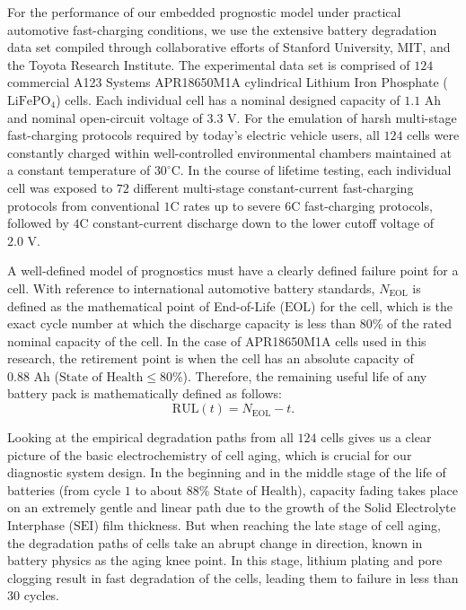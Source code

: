 \documentclass[pdflatex,sn-mathphys-num]{sn-jnl}%
\theoremstyle{thmstyleone}%
\theoremstyle{thmstyletwo}%
\theoremstyle{thmstylethree}%
\begin{document}
For the performance of our embedded prognostic model under practical automotive fast-charging conditions, we use the extensive battery degradation data set compiled through collaborative efforts of Stanford University, MIT, and the Toyota Research Institute. The experimental data set is comprised of $124$ commercial A123 Systems APR18650M1A cylindrical Lithium Iron Phosphate ($\text{LiFePO}_4$) cells. Each individual cell has a nominal designed capacity of $1.1\text{ Ah}$ and nominal open-circuit voltage of $3.3\text{ V}$. For the emulation of harsh multi-stage fast-charging protocols required by today's electric vehicle users, all $124$ cells were constantly charged within well-controlled environmental chambers maintained at a constant temperature of $30^\circ\text{C}$. In the course of lifetime testing, each individual cell was exposed to $72$ different multi-stage constant-current fast-charging protocols from conventional $1\text{C}$ rates up to severe $6\text{C}$ fast-charging protocols, followed by $4\text{C}$ constant-current discharge down to the lower cutoff voltage of $2.0\text{ V}$.

A well-defined model of prognostics must have a clearly defined failure point for a cell. With reference to international automotive battery standards, $N_{\text{EOL}}$ is defined as the mathematical point of End-of-Life ($\text{EOL}$) for the cell, which is the exact cycle number at which the discharge capacity is less than $80\%$ of the rated nominal capacity of the cell. In the case of APR18650M1A cells used in this research, the retirement point is when the cell has an absolute capacity of $0.88\text{ Ah}$ ($\text{State of Health} \le 80\%$). Therefore, the remaining useful life of any battery pack is mathematically defined as follows:
\begin{equation}
\text{RUL}(t) = N_{\text{EOL}} - t. \label{eq:rul_definition}
\end{equation}

Looking at the empirical degradation paths from all $124$ cells gives us a clear picture of the basic electrochemistry of cell aging, which is crucial for our diagnostic system design. In the beginning and in the middle stage of the life of batteries (from cycle $1$ to about $88\%$ State of Health), capacity fading takes place on an extremely gentle and linear path due to the growth of the Solid Electrolyte Interphase ($\text{SEI}$) film thickness. But when reaching the late stage of cell aging, the degradation paths of cells take an abrupt change in direction, known in battery physics as the aging knee point. In this stage, lithium plating and pore clogging result in fast degradation of the cells, leading them to failure in less than $30$ cycles.
\end{document}
